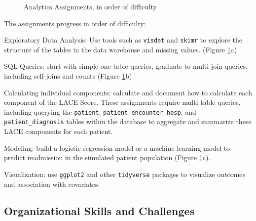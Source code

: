 \begin{Schunk}
\begin{figure}

{\centering {}\newline{}

}

\caption[Analytics Assignments, in order of difficulty]{Analytics Assignments, in order of difficulty}\label{fig:assignments}
\end{figure}
\end{Schunk}

The assignments progress in order of difficulty:

Exploratory Data Analysis: Use tools such as \texttt{visdat} and
\texttt{skimr} to explore the structure of the tables in the data
warehouse and missing values. (Figure \ref{fig:assignments}a)

SQL Queries: start with simple one table queries, graduate to multi join
queries, including self-joins and counts (Figure \ref{fig:assignments}b)

Calculating individual components: calculate and document how to
calculate each component of the LACE Score. These assignments require
multi table queries, including querying the \texttt{patient},
\texttt{patient\_encounter\_hosp}, and \texttt{patient\_diagnosis}
tables within the database to aggregate and summarize these LACE
components for each patient.

Modeling: build a logistic regression model or a machine learning model
to predict readmission in the simulated patient population (Figure
\ref{fig:assignments}c).

Visualization: use \texttt{ggplot2} and other \texttt{tidyverse}
packages to visualize outcomes and association with covariates.

\hypertarget{organizational-skills-and-challenges}{%
\subsection{Organizational Skills and
Challenges}\label{organizational-skills-and-challenges}}

